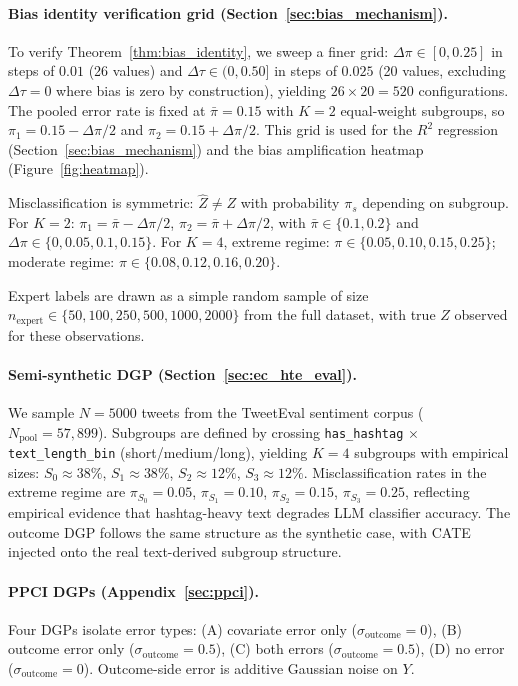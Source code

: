\paragraph{Bias identity verification grid (Section~\ref{sec:bias_mechanism}).}
To verify Theorem~\ref{thm:bias_identity}, we sweep a finer grid: $\Delta\pi \in [0, 0.25]$ in steps of $0.01$ (26 values) and $\Delta\tau \in (0, 0.50]$ in steps of $0.025$ (20 values, excluding $\Delta\tau = 0$ where bias is zero by construction), yielding $26 \times 20 = 520$ configurations.
The pooled error rate is fixed at $\bar{\pi} = 0.15$ with $K{=}2$ equal-weight subgroups, so $\pi_1 = 0.15 - \Delta\pi/2$ and $\pi_2 = 0.15 + \Delta\pi/2$.
This grid is used for the $R^2$ regression (Section~\ref{sec:bias_mechanism}) and the bias amplification heatmap (Figure~\ref{fig:heatmap}).

Misclassification is symmetric: $\hat{Z} \neq Z$ with probability $\pi_s$ depending on subgroup.
For $K{=}2$: $\pi_1 = \bar{\pi} - \Delta\pi/2$, $\pi_2 = \bar{\pi} + \Delta\pi/2$, with $\bar{\pi} \in \{0.1, 0.2\}$ and $\Delta\pi \in \{0, 0.05, 0.1, 0.15\}$.
For $K{=}4$, extreme regime: $\pi \in \{0.05, 0.10, 0.15, 0.25\}$; moderate regime: $\pi \in \{0.08, 0.12, 0.16, 0.20\}$.

Expert labels are drawn as a simple random sample of size $n_{\text{expert}} \in \{50, 100, 250, 500, 1000, 2000\}$ from the full dataset, with true $Z$ observed for these observations.

\paragraph{Semi-synthetic DGP (Section~\ref{sec:ec_hte_eval}).}
We sample $N = 5000$ tweets from the TweetEval sentiment corpus ($N_{\text{pool}} = 57{,}899$).
Subgroups are defined by crossing \texttt{has\_hashtag} $\times$ \texttt{text\_length\_bin} (short/medium/long), yielding $K = 4$ subgroups with empirical sizes: $S_0 \approx 38\%$, $S_1 \approx 38\%$, $S_2 \approx 12\%$, $S_3 \approx 12\%$.
Misclassification rates in the extreme regime are $\pi_{S_0} = 0.05$, $\pi_{S_1} = 0.10$, $\pi_{S_2} = 0.15$, $\pi_{S_3} = 0.25$, reflecting empirical evidence that hashtag-heavy text degrades LLM classifier accuracy.
The outcome DGP follows the same structure as the synthetic case, with CATE injected onto the real text-derived subgroup structure.

\paragraph{PPCI DGPs (Appendix~\ref{sec:ppci}).}
Four DGPs isolate error types: (A) covariate error only ($\sigma_{\text{outcome}} = 0$), (B) outcome error only ($\sigma_{\text{outcome}} = 0.5$), (C) both errors ($\sigma_{\text{outcome}} = 0.5$), (D) no error ($\sigma_{\text{outcome}} = 0$).
Outcome-side error is additive Gaussian noise on $Y$.


